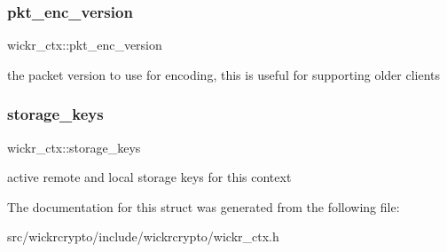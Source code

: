\subsubsection{\texorpdfstring{pkt\_enc\_version}{pkt\_enc\_version}}
{\footnotesize\ttfamily wickr\+\_\+ctx\+::pkt\+\_\+enc\+\_\+version}

the packet version to use for encoding, this is useful for supporting older clients \mbox{\label{structwickr__ctx_ab6d3ad69a6a16c0f582186b9d8461b66}} 
\subsubsection{\texorpdfstring{storage\_keys}{storage\_keys}}
{\footnotesize\ttfamily wickr\+\_\+ctx\+::storage\+\_\+keys}

active remote and local storage keys for this context 

The documentation for this struct was generated from the following file\+:\begin{DoxyCompactItemize}
\item 
src/wickrcrypto/include/wickrcrypto/wickr\+\_\+ctx.\+h\end{DoxyCompactItemize}

